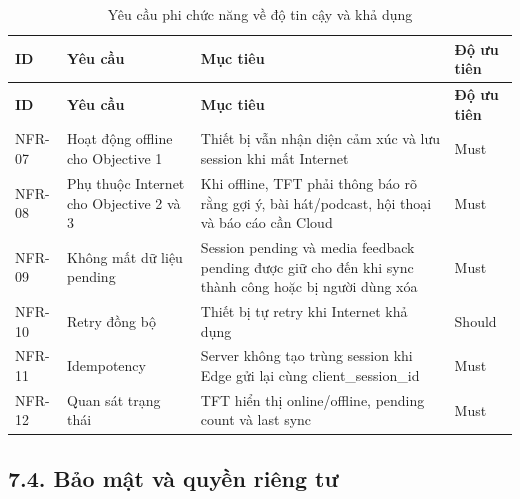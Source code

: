 \documentclass[12pt,a4paper]{article}
\begin{document}
\begin{center}
\scriptsize
\begin{longtable}{|P{0.13\textwidth}|P{0.25\textwidth}|P{0.38\textwidth}|P{0.14\textwidth}|}
\caption{Yêu cầu phi chức năng về độ tin cậy và khả dụng}\\
\hline
\textbf{ID} & \textbf{Yêu cầu} & \textbf{Mục tiêu} & \textbf{Độ ưu tiên} \\
\hline
\endfirsthead
\hline
\textbf{ID} & \textbf{Yêu cầu} & \textbf{Mục tiêu} & \textbf{Độ ưu tiên} \\
\hline
\endhead
NFR-07 & Hoạt động offline cho Objective 1 & Thiết bị vẫn nhận diện cảm xúc và lưu session khi mất Internet & Must \\
\hline
NFR-08 & Phụ thuộc Internet cho Objective 2 và 3 & Khi offline, TFT phải thông báo rõ rằng gợi ý, bài hát/podcast, hội thoại và báo cáo cần Cloud & Must \\
\hline
NFR-09 & Không mất dữ liệu pending & Session pending và media feedback pending được giữ cho đến khi sync thành công hoặc bị người dùng xóa & Must \\
\hline
NFR-10 & Retry đồng bộ & Thiết bị tự retry khi Internet khả dụng & Should \\
\hline
NFR-11 & Idempotency & Server không tạo trùng session khi Edge gửi lại cùng client\_session\_id & Must \\
\hline
NFR-12 & Quan sát trạng thái & TFT hiển thị online/offline, pending count và last sync & Must \\
\hline
\end{longtable}
\normalsize
\end{center}


\subsection*{7.4. Bảo mật và quyền riêng tư}
\end{document}
